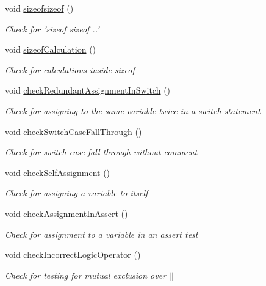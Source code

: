 \begin{DoxyCompactItemize}
void \hyperlink{class_check_other_a43253706e9282c135b4815a93b5f3f45}{sizeofsizeof} ()
\begin{DoxyCompactList}\small\item\em Check for 'sizeof sizeof ..' \end{DoxyCompactList}\item 
void \hyperlink{class_check_other_aad93a233f3e599fcc7f030db215ffc83}{sizeof\-Calculation} ()
\begin{DoxyCompactList}\small\item\em Check for calculations inside sizeof \end{DoxyCompactList}\item 
void \hyperlink{class_check_other_a15b114bb105bf01cba4df80146f91476}{check\-Redundant\-Assignment\-In\-Switch} ()
\begin{DoxyCompactList}\small\item\em Check for assigning to the same variable twice in a switch statement \end{DoxyCompactList}\item 
void \hyperlink{class_check_other_a5a8c638b4a5d613de40b3d47234df3ac}{check\-Switch\-Case\-Fall\-Through} ()
\begin{DoxyCompactList}\small\item\em Check for switch case fall through without comment \end{DoxyCompactList}\item 
void \hyperlink{class_check_other_a38d9fbfda11fc8d94f60224c3bd2258c}{check\-Self\-Assignment} ()
\begin{DoxyCompactList}\small\item\em Check for assigning a variable to itself \end{DoxyCompactList}\item 
void \hyperlink{class_check_other_ac72e91303e4d2e4a0b5c14c490092d06}{check\-Assignment\-In\-Assert} ()
\begin{DoxyCompactList}\small\item\em Check for assignment to a variable in an assert test \end{DoxyCompactList}\item 
void \hyperlink{class_check_other_a39f8ca7f072b2edbf76d83ee4642bf67}{check\-Incorrect\-Logic\-Operator} ()
\begin{DoxyCompactList}\small\item\em Check for testing for mutual exclusion over $|$$|$ \end{DoxyCompactList}\item 

\end{DoxyCompactItemize}
